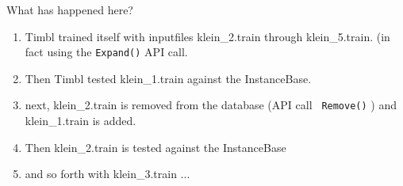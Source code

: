 \documentclass{article}
\begin{document}
What has happened here?

\begin{enumerate}
\item Timbl trained itself with inputfiles klein\_2.train through
klein\_5.train. (in fact using the {\tt Expand()} API call.
\item Then Timbl tested klein\_1.train against the InstanceBase.
\item next, klein\_2.train is removed from the database (API call {\tt
Remove()} ) and klein\_1.train is added.
\item Then klein\_2.train is tested against the InstanceBase
\item and so forth with klein\_3.train ...
\end{enumerate}
\end{document}
